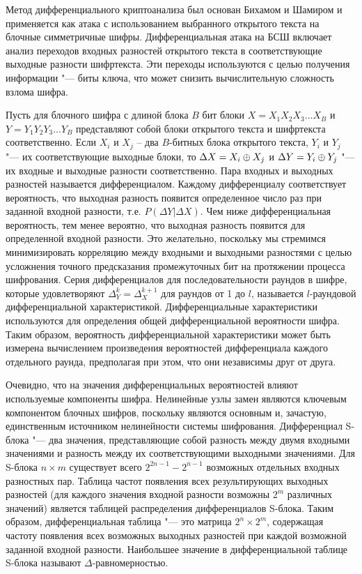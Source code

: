 Метод дифференциального криптоанализа был основан Бихамом и Шамиром и
применяется как атака с использованием выбранного открытого текста на блочные
симметричные шифры. Дифференциальная атака на БСШ включает анализ переходов
входных разностей открытого текста в соответствующие выходные разности
шифртекста. Эти переходы используются с целью получения информации "--- биты
ключа, что может снизить вычислительную сложность взлома шифра.

Пусть для блочного шифра с длиной блока $B$ бит блоки $X = X_1 X_2 X_3 \ldots
X_B$ и $Y = Y_1 Y_2 Y_3 \ldots Y_B$ представляют собой блоки открытого текста и
шифртекста соответственно. Если $X_i$ и $X_j$ – два $B$-битных блока открытого
текста, $Y_i$ и $Y_j$ "--- их соответствующие выходные блоки, то $\Delta X = X_i
\oplus X_j$ и $\Delta Y = Y_i \oplus Y_j$ "--- их входные и выходные разности
соответственно. Пара входных и выходных разностей называется дифференциалом.
Каждому дифференциалу соответствует вероятность, что выходная разность появится
определенное число раз при заданной входной разности, т.е. $P(\Delta Y | \Delta
X)$. Чем ниже дифференциальная вероятность, тем менее вероятно, что выходная
разность появится для определенной входной разности. Это желательно, поскольку
мы стремимся минимизировать корреляцию между входными и выходными разностями с
целью усложнения точного предсказания промежуточных бит на протяжении процесса
шифрования. Серия дифференциалов для последовательности раундов в шифре, которые
удовлетворяют $\Delta^k_Y = \Delta^{k+1}_X$ для раундов от 1 до $l$, называется
$l$-раундовой дифференциальной характеристикой. Дифференциальные характеристики
используются для определения общей дифференциальной вероятности шифра. Таким
образом, вероятность дифференциальной характеристики может быть измерена
вычислением произведения вероятностей дифференциала каждого отдельного раунда,
предполагая при этом, что они независимы друг от друга.

Очевидно, что на значения дифференциальных вероятностей влияют используемые
компоненты шифра. Нелинейные узлы замен являются ключевым компонентом блочных
шифров, поскольку являются основным и, зачастую, единственным источником
нелинейности системы шифрования. Дифференциал S-блока "--- два значения,
представляющие собой разность между двумя входными значениями и разность между
их соответствующими выходными значениями. Для S-блока $n \times m$ существует
всего $2^{2n-1} - 2^{n-1}$ возможных отдельных входных разностных пар. Таблица
частот появления всех результирующих выходных разностей (для каждого значения
входной разности возможны $2^m$ различных значений) является таблицей
распределения дифференциалов S-блока. Таким образом, дифференциальная таблица
"--- это матрица $2^n \times 2^m$, содержащая частоту появления всех возможных
выходных разностей при каждой возможной заданной входной разности. Наибольшее
значение в дифференциальной таблице S-блока называют $\Delta$-равномерностью.


